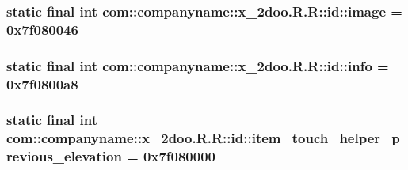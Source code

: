 \hypertarget{classcom_1_1companyname_1_1x__2doo_1_1_r_1_1id_232fcbbba62ba657a3fa8b8ad5299d3c}{
\subsubsection[{image}]{\setlength{\rightskip}{0pt plus 5cm}static final int com::companyname::x\_\-2doo.R.R::id::image = 0x7f080046}}
\label{classcom_1_1companyname_1_1x__2doo_1_1_r_1_1id_232fcbbba62ba657a3fa8b8ad5299d3c}


\hypertarget{classcom_1_1companyname_1_1x__2doo_1_1_r_1_1id_0f739968443003398137b3daed57d81d}{
\subsubsection[{info}]{\setlength{\rightskip}{0pt plus 5cm}static final int com::companyname::x\_\-2doo.R.R::id::info = 0x7f0800a8}}
\label{classcom_1_1companyname_1_1x__2doo_1_1_r_1_1id_0f739968443003398137b3daed57d81d}


\hypertarget{classcom_1_1companyname_1_1x__2doo_1_1_r_1_1id_577722f0a87e2485bfe0f42214d6516a}{
\subsubsection[{item\_\-touch\_\-helper\_\-previous\_\-elevation}]{\setlength{\rightskip}{0pt plus 5cm}static final int com::companyname::x\_\-2doo.R.R::id::item\_\-touch\_\-helper\_\-previous\_\-elevation = 0x7f080000}}
\label{classcom_1_1companyname_1_1x__2doo_1_1_r_1_1id_577722f0a87e2485bfe0f42214d6516a}


